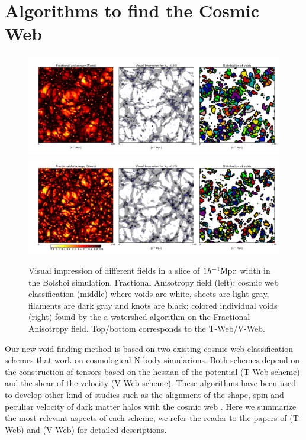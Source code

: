 \documentclass[a4,useAMS,usenatbib,usegraphicx]{mn2e}
\newcommand{\hMpc}{{\ifmmode{h^{-1}{\rm Mpc}}\else{$h^{-1}$Mpc}\fi}}
\begin{document}
\section{Algorithms to find the Cosmic Web}
\label{sec:algorithms_cosmic_web}


\begin{figure}
  \includegraphics[trim = 16mm 8mm 5mm 12mm, clip, keepaspectratio=true,
  width=0.73\textheight]{cosmicweb_FA_Tweb.pdf}
  \includegraphics[trim = 16mm 8mm 5mm 12mm, clip, keepaspectratio=true,
  width=0.73\textheight]{cosmicweb_FA_Vweb.pdf}
  \caption{Visual impression of different fields in a slice of
    $1\hMpc$ width in the Bolshoi simulation.   
    Fractional Anisotropy field (left); cosmic web classification
    (middle) where voids are white, sheets are light gray, filaments
    are dark gray and knots are black; colored individual
    voids (right) found by the a watershed algorithm on the Fractional
    Anisotropy field. Top/bottom corresponds to the T-Web/V-Web.}
  \label{fig:FA_field}
\end{figure}

Our new void finding method is based on two existing cosmic web
classification schemes that work on cosmological N-body simularions.
Both schemes depend on the construction of tensors based on the
hessian of the potential (T-Web scheme) and the shear of the velocity
(V-Web scheme). 
These algorithms have been used to develop other
kind of studies such as the alignment of the shape, spin and peculiar
velocity of dark matter halos with the cosmic web
\citep{Libeskind13,Forero2014}. 
Here we summarize the most relevant aspects of each scheme, we refer
the reader to the papers of \cite{Forero09} (T-Web) and
\cite{Hoffman12} (V-Web) for detailed descriptions. 
\end{document}
